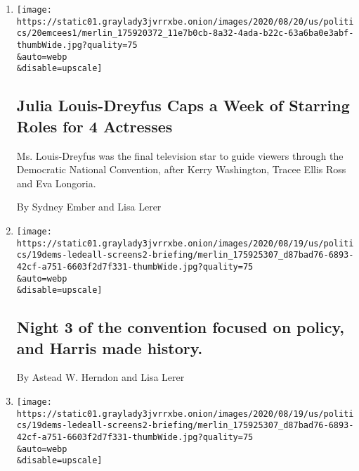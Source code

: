 \begin{enumerate}
\def\labelenumi{\arabic{enumi}.}
\item
  \href{/2020/08/20/us/politics/julia-louis-dreyfus-dnc.html}{}

  \texttt{[image: https://static01.graylady3jvrrxbe.onion/images/2020/08/20/us/politics/20emcees1/merlin\_175920372\_11e7b0cb-8a32-4ada-b22c-63a6ba0e3abf-thumbWide.jpg?quality=75\\\&auto=webp\\\&disable=upscale]}

  \hypertarget{julia-louis-dreyfus-caps-a-week-of-starring-roles-for-4-actresses}{%
  \subsection{Julia Louis-Dreyfus Caps a Week of Starring Roles for 4
  Actresses}\label{julia-louis-dreyfus-caps-a-week-of-starring-roles-for-4-actresses}}

  Ms. Louis-Dreyfus was the final television star to guide viewers
  through the Democratic National Convention, after Kerry Washington,
  Tracee Ellis Ross and Eva Longoria.

  By Sydney Ember and Lisa Lerer
\item
  \href{/2020/08/20/us/elections/night-3-of-the-convention-focused-on-policy-and-harris-made-history.html}{}

  \texttt{[image: https://static01.graylady3jvrrxbe.onion/images/2020/08/19/us/politics/19dems-ledeall-screens2-briefing/merlin\_175925307\_d87bad76-6893-42cf-a751-6603f2d7f331-thumbWide.jpg?quality=75\\\&auto=webp\\\&disable=upscale]}

  \hypertarget{night-3-of-the-convention-focused-on-policy-and-harris-made-history}{%
  \subsection{Night 3 of the convention focused on policy, and Harris
  made
  history.}\label{night-3-of-the-convention-focused-on-policy-and-harris-made-history}}

  By Astead W. Herndon and Lisa Lerer
\item
  \href{/live/2020/08/19/us/dnc-convention-election/night-3-featured-more-policy-a-focus-on-women-and-a-full-throated-rejection-of-trump-by-his-predecessor}{}

  \texttt{[image: https://static01.graylady3jvrrxbe.onion/images/2020/08/19/us/politics/19dems-ledeall-screens2-briefing/merlin\_175925307\_d87bad76-6893-42cf-a751-6603f2d7f331-thumbWide.jpg?quality=75\\\&auto=webp\\\&disable=upscale]}


\end{enumerate}
